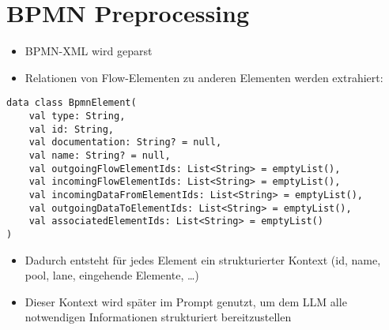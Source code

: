 \section{BPMN Preprocessing}\label{sec:bpmn-preprocessing}

\begin{itemize}
    \item BPMN-XML wird geparst
    \item Relationen von Flow-Elementen zu anderen Elementen werden extrahiert:
\end{itemize}

\begin{verbatim}
data class BpmnElement(
    val type: String,
    val id: String,
    val documentation: String? = null,
    val name: String? = null,
    val outgoingFlowElementIds: List<String> = emptyList(),
    val incomingFlowElementIds: List<String> = emptyList(),
    val incomingDataFromElementIds: List<String> = emptyList(),
    val outgoingDataToElementIds: List<String> = emptyList(),
    val associatedElementIds: List<String> = emptyList()
)
\end{verbatim}

\begin{itemize}
    \item Dadurch entsteht für jedes Element ein strukturierter Kontext (id, name, pool, lane, eingehende Elemente, \ldots)
    \item Dieser Kontext wird später im Prompt genutzt, um dem LLM alle notwendigen Informationen strukturiert bereitzustellen
\end{itemize}
